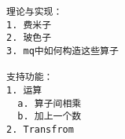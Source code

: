 \begin{lstlisting}
理论与实现：
1. 费米子
2. 玻色子
3. mq中如何构造这些算子

支持功能：
1. 运算
  a. 算子间相乘
  b. 加上一个数
2. Transfrom
\end{lstlisting}